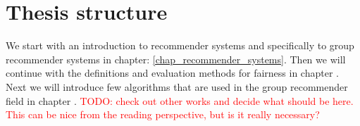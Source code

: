 \section{Thesis structure}

We start with an introduction to recommender systems and specifically to group recommender systems in chapter: \ref{chap_recommender_systems}. Then we will continue with the definitions and evaluation methods for fairness in chapter . Next we will introduce few algorithms that are used in the group recommender field in chapter .
\textcolor{red}{TODO: check out other works and decide what should be here. This can be nice from the reading perspective, but is it really necessary?}


